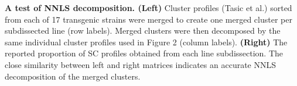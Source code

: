 \textbf{A test of NNLS decomposition. (Left)} Cluster profiles (Tasic et al.) sorted from each of 17 transgenic strains were merged to create one merged cluster per subdissected line (row labels). Merged clusters were then decomposed by the same individual cluster profiles used in Figure 2 (column labels). \textbf{(Right)} The reported proportion of SC profiles obtained from each line subdissection. The close similarity between left and right matrices indicates an accurate NNLS decomposition of the merged clusters.